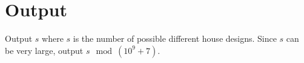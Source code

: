 
\section*{Output}

Output $s$ where $s$ is the number of possible different house designs.
Since $s$ can be very large, output $s \mod (10^9 + 7)$.
